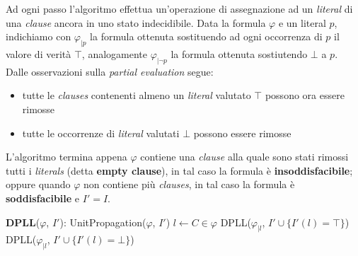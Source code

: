 Ad ogni passo l'algoritmo effettua un'operazione di assegnazione ad un \textit{literal} di una \textit{clause} ancora in uno stato indecidibile. Data la formula $\varphi$ e un literal $p$, indichiamo con $\varphi_{|p}$ la formula ottenuta sostituendo ad ogni occorrenza di $p$ il valore di verità $\top$, analogamente $\varphi_{|\lnot p}$ la formula ottenuta sostiutendo $\bot$ a $p$. Dalle osservazioni sulla \textit{partial evaluation} segue:
\begin{itemize}
\item tutte le \textit{clauses} contenenti almeno un \textit{literal} valutato $\top$ possono ora essere rimosse
\item tutte le occorrenze di \textit{literal} valutati $\bot$ possono essere rimosse
\end{itemize}

L'algoritmo termina appena $\varphi$ contiene una \textit{clause} alla quale sono stati rimossi tutti i \textit{literals} (detta \textbf{empty clause}), in tal caso la formula è \textbf{insoddisfacibile}; oppure quando $\varphi$ non contiene più \textit{clauses}, in tal caso la formula è \textbf{soddisfacibile} e $I' = I$.\\

\begin{mdframed}
\begin{algorithm}[H]
 \DontPrintSemicolon
 \;
 \textbf{DPLL}($\varphi$, $I'$):\;
 UnitPropagation($\varphi$, $I'$)\;
 $l \leftarrow C \in \varphi$\;
 DPLL($\varphi_{|l}$, $I' \cup \lbrace I'(l) = \top \rbrace$)\;
 DPLL($\varphi_{|l}$, $I' \cup \lbrace I'(l) = \bot \rbrace$)\; 
\end{algorithm}
\end{mdframed}
